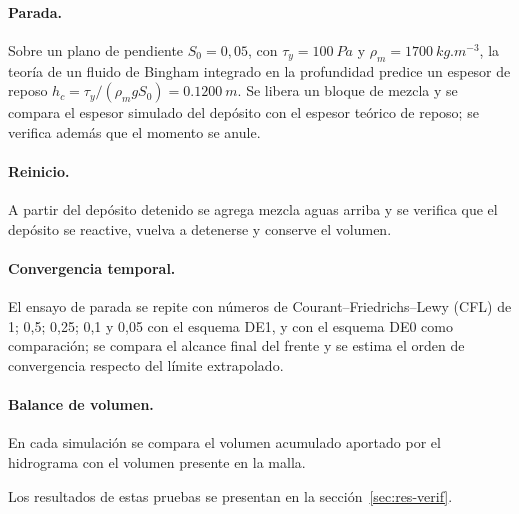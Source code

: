 \paragraph{Parada.} Sobre un plano de pendiente $S_0=0{,}05$, con $\tau_y=\SI{100}{Pa}$ y $\rho_m=\SI{1700}{kg.m^{-3}}$, la teoría de un fluido de Bingham integrado en la profundidad predice un espesor de reposo $h_c=\tau_y/(\rho_m gS_0)=\SI{0,1200}{m}$. Se libera un bloque de mezcla y se compara el espesor simulado del depósito con el espesor teórico de reposo; se verifica además que el momento se anule.

\paragraph{Reinicio.} A partir del depósito detenido se agrega mezcla aguas arriba y se verifica que el depósito se reactive, vuelva a detenerse y conserve el volumen.

\paragraph{Convergencia temporal.} El ensayo de parada se repite con números de Courant--Friedrichs--Lewy (CFL) de 1; 0,5; 0,25; 0,1 y 0,05 con el esquema DE1, y con el esquema DE0 como comparación; se compara el alcance final del frente y se estima el orden de convergencia respecto del límite extrapolado.

\paragraph{Balance de volumen.} En cada simulación se compara el volumen acumulado aportado por el hidrograma con el volumen presente en la malla.

Los resultados de estas pruebas se presentan en la sección~\ref{sec:res-verif}.
